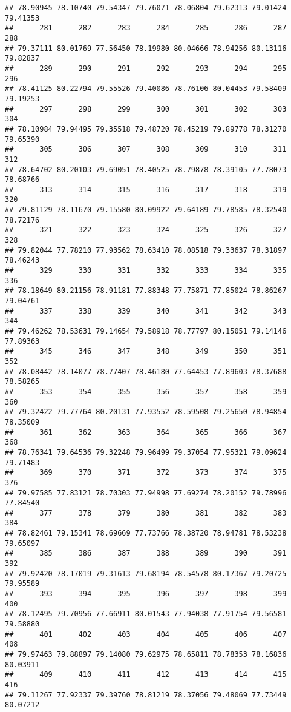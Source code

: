 \documentclass[
]{article}
\begin{document}
\begin{verbatim}
## 78.90945 78.10740 79.54347 79.76071 78.06804 79.62313 79.01424 79.41353 
##      281      282      283      284      285      286      287      288 
## 79.37111 80.01769 77.56450 78.19980 80.04666 78.94256 80.13116 79.82837 
##      289      290      291      292      293      294      295      296 
## 78.41125 80.22794 79.55526 79.40086 78.76106 80.04453 79.58409 79.19253 
##      297      298      299      300      301      302      303      304 
## 78.10984 79.94495 79.35518 79.48720 78.45219 79.89778 78.31270 79.65390 
##      305      306      307      308      309      310      311      312 
## 78.64702 80.20103 79.69051 78.40525 78.79878 78.39105 77.78073 78.68766 
##      313      314      315      316      317      318      319      320 
## 79.81129 78.11670 79.15580 80.09922 79.64189 79.78585 78.32540 78.72176 
##      321      322      323      324      325      326      327      328 
## 79.82044 77.78210 77.93562 78.63410 78.08518 79.33637 78.31897 78.46243 
##      329      330      331      332      333      334      335      336 
## 78.18649 80.21156 78.91181 77.88348 77.75871 77.85024 78.86267 79.04761 
##      337      338      339      340      341      342      343      344 
## 79.46262 78.53631 79.14654 79.58918 78.77797 80.15051 79.14146 77.89363 
##      345      346      347      348      349      350      351      352 
## 78.08442 78.14077 78.77407 78.46180 77.64453 77.89603 78.37688 78.58265 
##      353      354      355      356      357      358      359      360 
## 79.32422 79.77764 80.20131 77.93552 78.59508 79.25650 78.94854 78.35009 
##      361      362      363      364      365      366      367      368 
## 78.76341 79.64536 79.32248 79.96499 79.37054 77.95321 79.09624 79.71483 
##      369      370      371      372      373      374      375      376 
## 79.97585 77.83121 78.70303 77.94998 77.69274 78.20152 79.78996 77.84540 
##      377      378      379      380      381      382      383      384 
## 78.82461 79.15341 78.69669 77.73766 78.38720 78.94781 78.53238 79.65097 
##      385      386      387      388      389      390      391      392 
## 79.92420 78.17019 79.31613 79.68194 78.54578 80.17367 79.20725 79.95589 
##      393      394      395      396      397      398      399      400 
## 78.12495 79.70956 77.66911 80.01543 77.94038 77.91754 79.56581 79.58880 
##      401      402      403      404      405      406      407      408 
## 79.97463 79.88897 79.14080 79.62975 78.65811 78.78353 78.16836 80.03911 
##      409      410      411      412      413      414      415      416 
## 79.11267 77.92337 79.39760 78.81219 78.37056 79.48069 77.73449 80.07212 

\end{verbatim}
\end{document}
